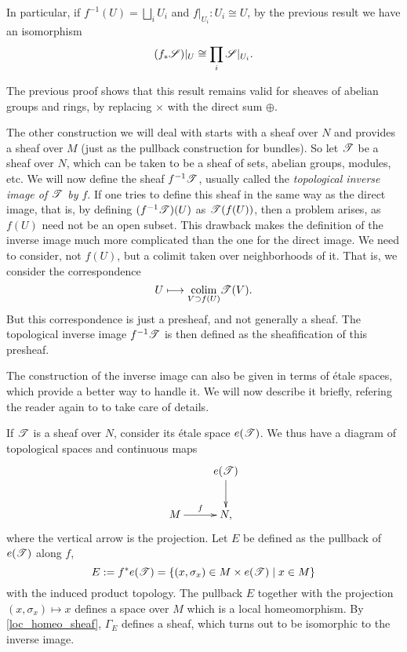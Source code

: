 In particular, if $f^{-1}(U)=\bigsqcup_iU_i$ and $f|_{U_i}:U_i\cong U$, by the previous result we have an isomorphism
$$(f_*\mathscr{S})|_U\cong \prod_i\mathscr{S}|_{U_i}.$$

\begin{obs}
The previous proof shows that this result remains valid for sheaves of abelian groups and rings, by replacing $\times$ with the direct sum $\oplus$.
\end{obs}

The other construction we will deal with starts with a sheaf over $N$ and provides a sheaf over $M$ (just as the pullback construction for bundles). So let $\mathscr{T}$ be a sheaf over $N$, which can be taken to be a sheaf of sets, abelian groups, modules, etc. We will now define the sheaf $f^{-1}\mathscr{T}$, usually called the \emph{topological inverse image of $\mathscr{T}$ by $f$}. If one tries to define this sheaf in the same way as the direct image, that is, by defining $(f^{-1}\mathscr{T})(U)$ as $\mathscr{T}(f(U))$, then a problem arises, as $f(U)$ need not be an open subset. This drawback makes the definition of the inverse image much more complicated than the one for the direct image. We need to consider, not $f(U)$, but a colimit taken over neighborhoods of it. That is, we consider the correspondence
\begin{equation}\label{presheaf_inv}
U\longmapsto \underset{V\supset f(U)}{\operatorname{colim}}\mathscr{T}(V).
\end{equation}
But this correspondence is just a presheaf, and not generally a sheaf. The topological inverse image $f^{-1}\mathscr{T}$ is then defined as the sheafification of this presheaf.

The construction of the inverse image can also be given in terms of \'etale spaces, which provide a better way to handle it. We will now describe it briefly, refering the reader again to \cite{tennison:_sheaf} to take care of details.

If $\mathscr{T}$ is a sheaf over $N$, consider its \'etale space $e(\mathscr{T})$. We thus have a diagram of topological spaces and continuous maps
$$
\xymatrix{
  & e(\scr{T}) \ar[d] \\
M \ar[r]^f & N,}
$$
where the vertical arrow is the projection. Let $E$ be defined as the pullback of $e(\mathscr{T})$ along $f$,
$$E:=f^*e(\mathscr{T})=\{(x,\sigma_x)\in M\times e(\mathscr{T})\; | \; x\in M\}$$
with the induced product topology. The pullback $E$ together with the projection $(x,\sigma_x)\mapsto x$ defines a space over $M$ which is a local homeomorphism. By \ref{loc_homeo_sheaf}, $\Gamma_E$ defines a sheaf, which turns out to be isomorphic to the inverse image.

